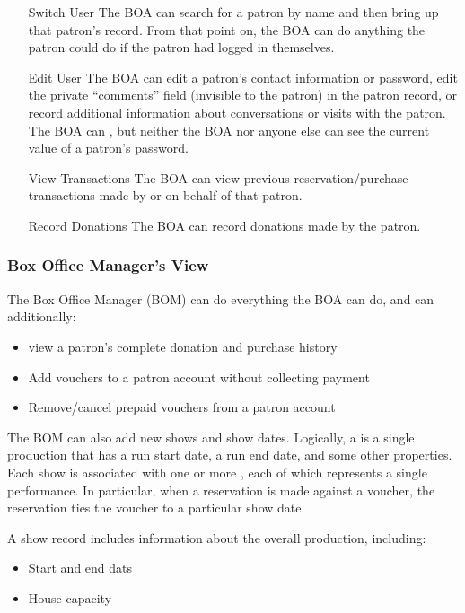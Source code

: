 \begin{itemize}
\item[Switch User] The BOA can search for a patron by name
  and then bring up that patron's record.  From that point on, the BOA
  can do anything the patron could do if the patron had logged in
  themselves.
\item[Edit User] The BOA can edit a patron's contact information or
  password, edit the private ``comments'' field (invisible to the
  patron) in the patron record, or record additional information about
  conversations or visits with the patron.  The BOA can , but neither the BOA nor anyone else can see the
  current value of a patron's password.
\item[View Transactions] The BOA can view previous reservation/purchase
  transactions made by or on behalf of that patron.
\item[Record Donations] The BOA can record donations made by the
  patron. 
\end{itemize}

\subsubsection{Box Office Manager's View}

The Box Office Manager (BOM) can do everything the BOA can do, and can
additionally:

\begin{itemize}
\item view a patron's complete donation and purchase history
\item Add vouchers to a patron account without collecting payment
\item Remove/cancel prepaid vouchers from a patron account
\end{itemize}

The BOM can also add new shows and show dates.  Logically, a  is
a single production that has a run start date, a run end date, and some
other properties.  Each show is associated with one or more , each of which represents a single performance.  In particular,
when a reservation is made against a voucher, the reservation ties the
voucher to a particular show date.

A show record includes information about the overall production,
including:
\begin{itemize}
\item Start and end dats
\item House capacity
\end{itemize}

